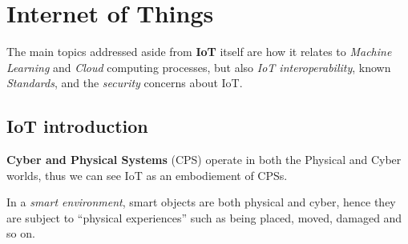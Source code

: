 \chapter{Internet of Things}

The main topics addressed aside from \textbf{IoT} itself are how it relates to \textit{Machine Learning} and \textit{Cloud} computing processes, but also \textit{IoT interoperability}, known \textit{Standards}, and the \textit{security} concerns about IoT.

\section{IoT introduction}
\textbf{Cyber and Physical Systems} (CPS) operate in both the Physical and Cyber worlds, thus we can see IoT as an embodiement of CPSs.

In a \textit{smart environment}, smart objects are both physical and cyber, hence they are subject to ``physical experiences'' such as being placed, moved, damaged and so on.

